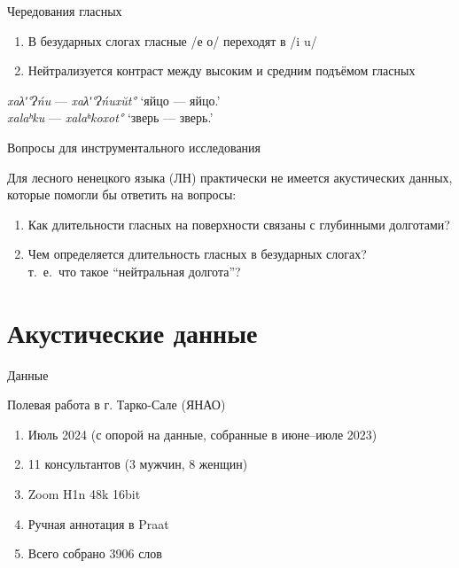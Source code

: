 \documentclass[10 pt, handout]{beamer}
\begin{document}
\begin{frame}{Чередования гласных}

	\begin{enumerate}[\ding{96}]
		\item В безударных слогах гласные /е о/ переходят в /i u/
		\item Нейтрализуется контраст между высоким и средним подъёмом гласных
	\end{enumerate}

		
	\ex	\emph{xaλʹ°ʔńu} --- \emph{xaλʹ°ʔńuxŭt°} \hfill `яйцо --- яйцо.{\Abl}'\\ %
		\emph{xalaʰku} --- \emph{xalaʰkoxot°} \hfill `зверь --- зверь.{\Abl}'
	\xe

\end{frame}

\begin{frame}{Вопросы для инструментального исследования}

	Для лесного ненецкого языка (ЛН) практически не имеется акустических данных, которые помогли бы ответить на вопросы:
	\vspace*{1em}
	
	\begin{enumerate}[\ding{50}]
		\item Как длительности гласных на поверхности связаны с глубинными долготами?
		\item Чем определяется длительность гласных в безударных слогах?\\
			т.\ е.\ что такое ``нейтральная долгота''?
	\end{enumerate}

\end{frame}

			\section{Акустические данные} 

\begin{frame}{Данные}

	Полевая работа в г. Тарко-Сале (ЯНАО)

	\begin{enumerate}[\ding{68}]
		\item Июль 2024 (с опорой на данные, собранные в июне--июле 2023)
		\item 11 консультантов (3 мужчин, 8 женщин)
		\item Zoom H1n 48k 16bit
		\item Ручная аннотация в Praat \parencite{praat}
		\item Всего собрано 3906 слов
	\end{enumerate}

\end{frame}
\end{document}
